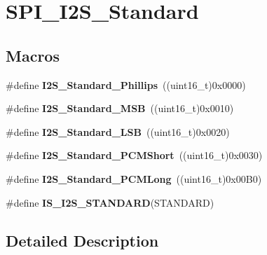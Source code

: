 \hypertarget{group___s_p_i___i2_s___standard}{\section{S\-P\-I\-\_\-\-I2\-S\-\_\-\-Standard}
\label{group___s_p_i___i2_s___standard}
}
\subsection*{Macros}
\begin{DoxyCompactItemize}
\item 
\hypertarget{group___s_p_i___i2_s___standard_gacdb89d66a2a941924ff4b7a8d14884f9}{\#define {\bfseries I2\-S\-\_\-\-Standard\-\_\-\-Phillips}~((uint16\-\_\-t)0x0000)}\label{group___s_p_i___i2_s___standard_gacdb89d66a2a941924ff4b7a8d14884f9}

\item 
\hypertarget{group___s_p_i___i2_s___standard_gae716cfa7e031affc37fe65dd80b0e6f4}{\#define {\bfseries I2\-S\-\_\-\-Standard\-\_\-\-M\-S\-B}~((uint16\-\_\-t)0x0010)}\label{group___s_p_i___i2_s___standard_gae716cfa7e031affc37fe65dd80b0e6f4}

\item 
\hypertarget{group___s_p_i___i2_s___standard_ga88bc9001a13b95a0844d81fea2080df6}{\#define {\bfseries I2\-S\-\_\-\-Standard\-\_\-\-L\-S\-B}~((uint16\-\_\-t)0x0020)}\label{group___s_p_i___i2_s___standard_ga88bc9001a13b95a0844d81fea2080df6}

\item 
\hypertarget{group___s_p_i___i2_s___standard_gaaf59e587048ff632037dfc9875ab4c7b}{\#define {\bfseries I2\-S\-\_\-\-Standard\-\_\-\-P\-C\-M\-Short}~((uint16\-\_\-t)0x0030)}\label{group___s_p_i___i2_s___standard_gaaf59e587048ff632037dfc9875ab4c7b}

\item 
\hypertarget{group___s_p_i___i2_s___standard_gaf79cb88702059506d876dbd776d7a136}{\#define {\bfseries I2\-S\-\_\-\-Standard\-\_\-\-P\-C\-M\-Long}~((uint16\-\_\-t)0x00\-B0)}\label{group___s_p_i___i2_s___standard_gaf79cb88702059506d876dbd776d7a136}

\item 
\#define {\bfseries I\-S\-\_\-\-I2\-S\-\_\-\-S\-T\-A\-N\-D\-A\-R\-D}(S\-T\-A\-N\-D\-A\-R\-D)
\end{DoxyCompactItemize}


\subsection{Detailed Description}


